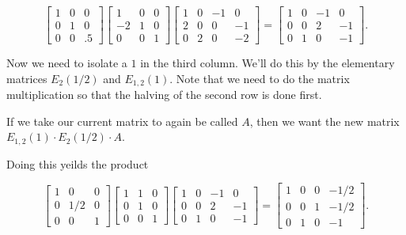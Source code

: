 \documentclass{ximera}
\begin{document}
\begin{exploration}
\begin{example}
\begin{equation*}
 \begin{bmatrix}
    1 & 0 & 0 \\
    0 & 1 & 0 \\
    0 & 0 & .5
  \end{bmatrix} \begin{bmatrix}
    1 & 0 & 0 \\
    -2 & 1 & 0 \\
    0 & 0 & 1
  \end{bmatrix} \begin{bmatrix}
    1 & 0 & -1 & 0 \\
    2 & 0 & 0 & -1 \\
    0 & 2 & 0 & -2
  \end{bmatrix} = \begin{bmatrix}
    1 & 0 & -1 & 0 \\
    0 & 0 & 2 & -1 \\
    0 & 1 & 0 & -1
  \end{bmatrix}.
\end{equation*}

Now we need to isolate a $1$ in the third column. We'll do this by the elementary matrices $E_{2}(1/2)$ and $E_{1,2}(1)$. Note that we need to do the matrix multiplication so that the halving of the second row is done first.

If we take our current matrix to again be called $A$, then we want the new matrix $E_{1,2}(1)\cdot E_{2}(1/2)\cdot A$.

Doing this yeilds the product

\begin{equation*}
  \begin{bmatrix}
    1 & 0 & 0 \\
    0 & 1/2 & 0 \\
    0 & 0 & 1
  \end{bmatrix} \begin{bmatrix}
    1 & 1 & 0 \\
    0 & 1 & 0 \\
    0 & 0 & 1
  \end{bmatrix} \begin{bmatrix}
    1 & 0 & -1 & 0 \\
    0 & 0 & 2 & -1 \\
    0 & 1 & 0 & -1
  \end{bmatrix} = \begin{bmatrix}
    1 & 0 & 0 & -1/2 \\
    0 & 0 & 1 & -1/2 \\
    0 & 1 & 0 & -1
  \end{bmatrix}.
\end{equation*}


\end{example}
\end{exploration}
\end{document}
